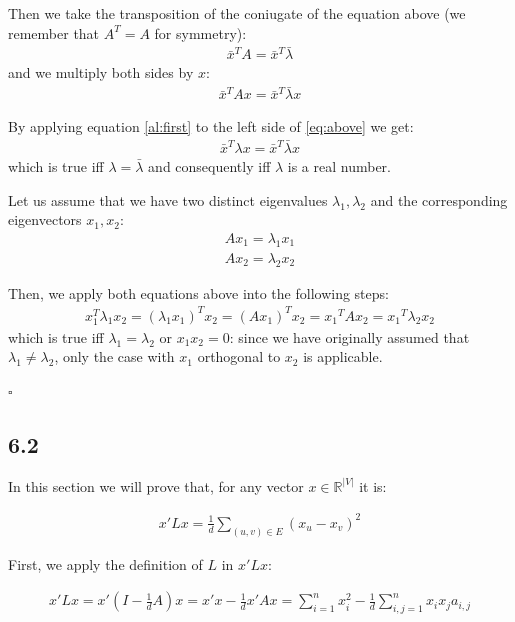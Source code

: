 \documentclass[12pt,a4paper]{article}
\newcommand*{\QEDB}{\hfill\ensuremath{\square}}%
\begin{document}
Then we take the  transposition of the coniugate of the equation above (we remember that $A^T = A$ for symmetry):
\begin{align}
\bar{x}^T A = {\bar{x}}^T \bar{\lambda}
\end{align}
and we multiply both sides by $x$:
\begin{align}\label{eq:above}
\bar{x}^T A x = {\bar{x}}^T \bar{\lambda} x
\end{align}

By applying equation \eqref{al:first} to the left side of \eqref{eq:above} we get:
\begin{align}
\bar{x}^T \lambda x = {\bar{x}}^T \bar{\lambda} x
\end{align}
which is true iff $\lambda = \bar{\lambda}$ and consequently iff $\lambda$ is a real number.

Let us assume that we have two distinct eigenvalues $\lambda_1, \lambda_2$ and the corresponding eigenvectors $x_1, x_2$:
\begin{align}
A x_1 = \lambda_1 x_1\\
A x_2 = \lambda_2 x_2
\end{align}

Then, we apply both equations above into the following steps:
\begin{align}
x_1^T \lambda_1 x_2 = {(\lambda_1 x_1)}^T x_2 = {(A x_1)}^T x_2 = {x_1}^T A x_2 = {x_1}^T \lambda_2 x_2
\end{align}
which is true iff $\lambda_1 = \lambda_2$ or $x_1 x_2 = 0$: since we have originally assumed that $\lambda_1 \not= \lambda_2$, only the case with $x_1$ orthogonal to $x_2$ is applicable.

\QEDB



\subsection*{6.2}

In this section we will prove that, for any vector $x \in \mathbb{R}^{|V|}$ it is:

\begin{align}
x' L x = \frac{1}{d} \sum_{(u, v) \in E} (x_u - x_v)^2
\end{align}


First, we apply the definition of $L$ in $x' L x$:

\begin{align}
x' L x = x' (I - \frac{1}{d} A) x = x' x - \frac{1}{d} x' A x = \sum_{i = 1}^n {x^2_i} - \frac{1}{d} \sum_{i, j = 1}^n x_i x_j  a_{i, j}
\end{align}
\end{document}
